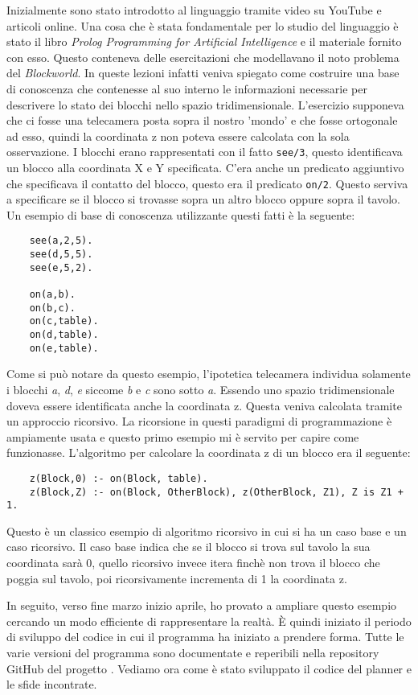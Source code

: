 Inizialmente sono stato introdotto al linguaggio tramite video su YouTube e articoli online. Una cosa che è stata fondamentale per
lo studio del linguaggio è stato il libro \textit{Prolog Programming for Artificial Intelligence} \cite{bratko2001prolog} e il materiale fornito con esso.
Questo conteneva delle esercitazioni che modellavano il noto problema del \textit{Blockworld}. In queste lezioni infatti veniva spiegato come costruire una base di conoscenza che contenesse al suo interno
le informazioni necessarie per descrivere lo stato dei blocchi nello spazio tridimensionale. L'esercizio supponeva che ci fosse una telecamera posta sopra il nostro 'mondo' e che fosse ortogonale ad esso, quindi la coordinata z non poteva essere calcolata con la sola osservazione.
I blocchi erano rappresentati con il fatto \verb+see/3+, questo identificava un blocco alla coordinata X e Y specificata.
C'era anche un predicato aggiuntivo che specificava il contatto del blocco, questo era il predicato \verb+on/2+. Questo serviva a specificare se il blocco si trovasse sopra un altro blocco oppure sopra il tavolo.
Un esempio di base di conoscenza utilizzante questi fatti è la seguente:
\begin{verbatim}
    see(a,2,5).
    see(d,5,5).
    see(e,5,2).

    on(a,b).
    on(b,c).
    on(c,table).
    on(d,table).
    on(e,table).
\end{verbatim}
Come si può notare da questo esempio, l'ipotetica telecamera individua solamente i blocchi \textit{a}, \textit{d}, \textit{e} siccome  \textit{b} e \textit{c} sono sotto \textit{a}.
Essendo uno spazio tridimensionale doveva essere identificata anche la coordinata z. Questa veniva calcolata tramite un approccio ricorsivo. La ricorsione in questi paradigmi di programmazione è ampiamente usata e questo primo esempio mi è servito per capire come funzionasse.
L'algoritmo per calcolare la coordinata z di un blocco era il seguente:
\begin{verbatim}
    z(Block,0) :- on(Block, table).
    z(Block,Z) :- on(Block, OtherBlock), z(OtherBlock, Z1), Z is Z1 + 1.
\end{verbatim}
Questo è un classico esempio di algoritmo ricorsivo in cui si ha un caso base e un caso ricorsivo. Il caso base indica che se il blocco si trova sul tavolo la sua coordinata sarà 0, quello ricorsivo invece itera finchè non trova il blocco che poggia sul tavolo, poi ricorsivamente incrementa di 1 la coordinata z.

In seguito, verso fine marzo inizio aprile, ho provato a ampliare questo esempio cercando un modo efficiente di rappresentare la realtà. È quindi iniziato il periodo di sviluppo del codice in cui il programma ha iniziato a prendere forma. Tutte le varie versioni del programma sono documentate e reperibili nella repository GitHub del progetto \cite{gitrepo}.
Vediamo ora come è stato sviluppato il codice del planner e le sfide incontrate.
